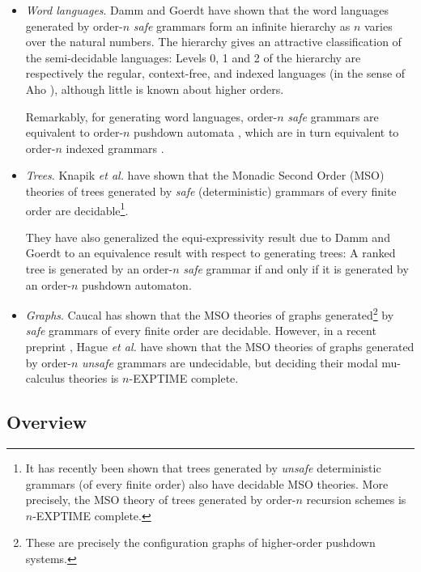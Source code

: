 \begin{itemize}
\item \emph{Word languages}. Damm and Goerdt \cite{DG86} have shown
  that the word languages generated by order-$n$ \emph{safe} grammars
  form an infinite hierarchy as $n$ varies over the natural numbers.
  The hierarchy gives an attractive classification of the
  semi-decidable languages: Levels 0, 1 and 2 of the hierarchy are
  respectively the regular, context-free, and indexed languages (in
  the sense of Aho \cite{Aho68}), although little is known about
  higher orders.

  Remarkably, for generating word languages, order-$n$ \emph{safe}
  grammars are equivalent to order-$n$ pushdown automata \cite{DG86},
  which are in turn equivalent to order-$n$ indexed grammars
  \cite{Mas74,Mas76}.

\item \emph{Trees}. Knapik \emph{et al.} have shown that the Monadic
  Second Order (MSO) theories of trees generated by \emph{safe}
  (deterministic) grammars of every finite order are
  decidable\footnote{It has recently been shown
    \cite{OngLics2006} that trees generated by \emph{unsafe}
    deterministic grammars (of every finite order) also have decidable
    MSO theories. More precisely, the MSO theory of trees generated by order-$n$
recursion schemes is $n$-EXPTIME complete.}.

  They have also generalized the equi-expressivity result due to Damm
  and Goerdt \cite{DG86} to an equivalence result with respect to
  generating trees: A ranked tree is generated by an order-$n$ \emph{safe}
  grammar if and only if it is generated by an order-$n$ pushdown
  automaton.

\item \emph{Graphs}. Caucal \cite{Cau02} has shown that the MSO
  theories of graphs generated\footnote{These are precisely the
    configuration graphs of higher-order pushdown systems.} by
  \emph{safe} grammars of every finite order are decidable. However,
  in a recent preprint \cite{hague-sto07}, Hague \emph{et al.} have
  shown that the MSO theories of graphs generated by order-$n$
  \emph{unsafe} grammars are undecidable, but deciding their modal
  mu-calculus theories is $n$-EXPTIME complete.
\end{itemize}

\subsection*{Overview}

